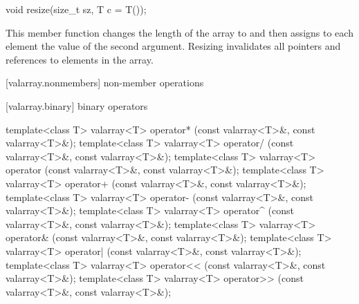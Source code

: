 %
\begin{itemdecl}
void resize(size_t sz, T c = T());
\end{itemdecl}

\begin{itemdescr}
\pnum
This member function changes the length of the
array to
and then assigns to each element the value of the second argument.
Resizing invalidates all pointers and references to elements in the array.
\end{itemdescr}

[valarray.nonmembers]{ non-member operations}

[valarray.binary]{ binary operators}

%
%
%
%
%
%
%
%
%
%
%
%
%
%
\begin{itemdecl}
template<class T> valarray<T> operator*
    (const valarray<T>&, const valarray<T>&);
template<class T> valarray<T> operator/
    (const valarray<T>&, const valarray<T>&);
template<class T> valarray<T> operator%
    (const valarray<T>&, const valarray<T>&);
template<class T> valarray<T> operator+
    (const valarray<T>&, const valarray<T>&);
template<class T> valarray<T> operator-
    (const valarray<T>&, const valarray<T>&);
template<class T> valarray<T> operator^
    (const valarray<T>&, const valarray<T>&);
template<class T> valarray<T> operator&
    (const valarray<T>&, const valarray<T>&);
template<class T> valarray<T> operator|
    (const valarray<T>&, const valarray<T>&);
template<class T> valarray<T> operator<<
    (const valarray<T>&, const valarray<T>&);
template<class T> valarray<T> operator>>
    (const valarray<T>&, const valarray<T>&);
\end{itemdecl}

